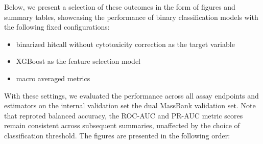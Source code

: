 Below, we present a selection of these outcomes in the form of figures and summary tables, showcasing the performance of binary classification models with the following fixed configurations:
\begin{itemize}
  \item binarized hitcall without cytotoxicity correction as the target variable
  \item XGBoost as the feature selection model
  \item macro averaged metrics
\end{itemize}

With these settings, we evaluated the performance across all assay endpoints and estimators on the internal validation set the dual MassBank validation set. Note that reproted balanced accuracy, the ROC-AUC and PR-AUC metric scores remain consistent across subsequent summaries, unaffected by the choice of classification threshold. The figures are presented in the following order:

